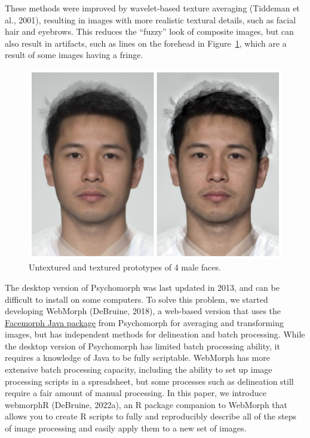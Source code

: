 \documentclass[
  man,floatsintext]{apa6}
\begin{document}
These methods were improved by wavelet-based texture averaging (Tiddeman et al., 2001), resulting in images with more realistic textural details, such as facial hair and eyebrows. This reduces the ``fuzzy'' look of composite images, but can also result in artifacts, such as lines on the forehead in Figure~\ref{fig:texture-comp}, which are a result of some images having a fringe.

\begin{figure}
\includegraphics[width=1\linewidth]{index_files/figure-latex/texture-comp-1} \caption{Untextured and textured prototypes of 4 male faces.}\label{fig:texture-comp}
\end{figure}

The desktop version of Psychomorph was last updated in 2013, and can be difficult to install on some computers. To solve this problem, we started developing WebMorph (DeBruine, 2018), a web-based version that uses the \href{https://users.aber.ac.uk/bpt/jpsychomorph/version6/javadoc/}{Facemorph Java package} from Psychomorph for averaging and transforming images, but has independent methods for delineation and batch processing. While the desktop version of Psychomorph has limited batch processing ability, it requires a knowledge of Java to be fully scriptable. WebMorph has more extensive batch processing capacity, including the ability to set up image processing scripts in a spreadsheet, but some processes such as delineation still require a fair amount of manual processing. In this paper, we introduce webmorphR (DeBruine, 2022a), an R package companion to WebMorph that allows you to create R scripts to fully and reproducibly describe all of the steps of image processing and easily apply them to a new set of images.
\end{document}
